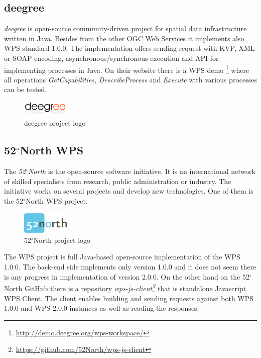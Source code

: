 \subsection{deegree}

\textit{deegree} is open-source community-driven project for spatial
data infrastructure written in Java. Besides from the other OGC Web
Services it implements also WPS standard 1.0.0. The implementation offers
sending request with KVP, XML or SOAP encoding,
asynchronous/synchronous execution and API for implementing processes
in Java. On their website there is a WPS demo
\footnote{\url{http://demo.deegree.org/wps-workspace/}} where all
operations \textit{GetCapabilities}, \textit{DescribeProcess} and
\textit{Execute} with various processes can be tested.

\bigskip
\begin{figure}[h!]
\centering
\includegraphics[width=0.2\textwidth]{img/deegree.png}
\caption{deegree project logo}
\label{fig:deegree}
\end{figure}

\subsection{52$^{\circ}$North WPS}
The \textit{52$^{\circ}$North} is the open-source software initiative. It is an international network of skilled specialists from research,
public administration or industry. The initiative works on several projects and
develop new technologies. One of them is the 52$^{\circ}$North WPS project.

\bigskip
\begin{figure}[h!]
\centering
\includegraphics[width=0.2\textwidth]{img/Intro_52north.png}
\caption{52$^{\circ}$North project logo}
\label{fig:Intro_52north}
\end{figure}

The WPS project is full Java-based open-source implementation of the
WPS 1.0.0. The back-end side implements only version 1.0.0 and it does
not seem there is any progress in implementation of version 2.0.0. On
the other hand on the 52$^{\circ}$North GitHub there is a repository
\textit{wps-js-client\footnote{\url{https://github.com/52North/wps-js-client}}}
that is standalone Javascript WPS Client.  The client enables building
and sending requests against both WPS 1.0.0 and WPS 2.0.0 instances as
well as reading the responses.

